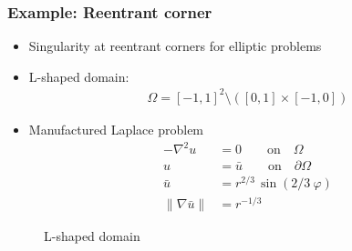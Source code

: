 \begin{frame}
\frametitle{Example: Reentrant corner}

\begin{minipage}{.47\textwidth}
\begin{itemize}
  \item Singularity at reentrant corners for elliptic problems
  \item L-shaped domain:
    \begin{align*}
    \Omega = [-1,1]^2 \setminus \left([0,1]\!\times\![-1,0]\right)
    \end{align*}
  \item Manufactured Laplace problem
    \begin{align*}
    - \nabla^2 u &= 0 \qquad\text{on}\quad \Omega \\
    u &= \bar{u} \qquad\text{on}\quad \partial\Omega \\[.5em]
    \bar{u} &= r^{2/3} \, \sin\left(2/3 ~ \varphi\right) \\
    \|\nabla \bar{u}\| &= r^{-1/3}
    \end{align*}
\end{itemize}
\end{minipage}
\hfill{}
\begin{minipage}{.51\textwidth}
  \begin{figure}
  \caption{L-shaped domain}
  \end{figure}
\end{minipage}
\end{frame}





